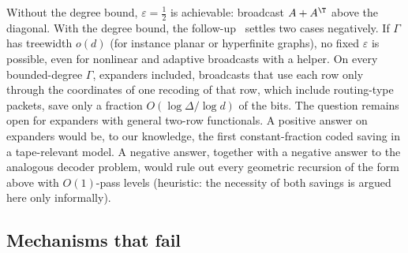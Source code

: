Without the degree bound, $\varepsilon=\tfrac12$ is achievable: broadcast $A+A^{\T}$ above the diagonal. With the degree bound, the follow-up~\cite{BrendeAstra2026} settles two cases negatively. If $\Gamma$ has treewidth $o(d)$ (for instance planar or hyperfinite graphs), no fixed $\varepsilon$ is possible, even for nonlinear and adaptive broadcasts with a helper. On every bounded-degree $\Gamma$, expanders included, broadcasts that use each row only through the coordinates of one recoding of that row, which include routing-type packets, save only a fraction $O(\log\Delta/\log d)$ of the bits. The question remains open for expanders with general two-row functionals. A positive answer on expanders would be, to our knowledge, the first
constant-fraction coded saving in a tape-relevant model. A negative answer, together with a negative answer to the
analogous decoder problem, would rule out every geometric recursion of the form above with $O(1)$-pass levels
(heuristic: the necessity of both savings is argued here only informally).

\subsection{Mechanisms that fail}

